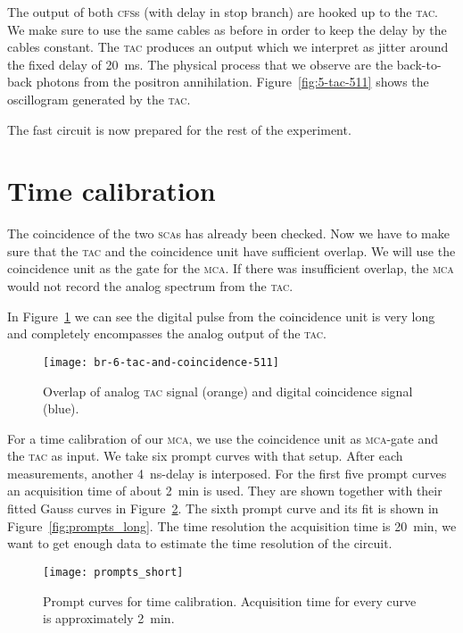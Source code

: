 \documentclass[11pt, english, fleqn, DIV=15, headinclude, BCOR=2cm]{scrreprt}
\begin{document}
The output of both \textsc{cfs}s (with delay in stop branch) are hooked up to
the \textsc{tac}. We make sure to use the same cables as before in order to
keep the delay by the cables constant. The \textsc{tac} produces an output
which we interpret as jitter around the fixed delay of \SI{20}{\milli\second}.
The physical process that we observe are the back-to-back photons from the
positron annihilation. Figure~\ref{fig:5-tac-511} shows the oscillogram
generated by the \textsc{tac}.

The fast circuit is now prepared for the rest of the experiment.

\section{Time calibration}

The coincidence of the two \textsc{sca}s has already been checked. Now we have
to make sure that the \textsc{tac} and the coincidence unit have sufficient
overlap. We will use the coincidence unit as the gate for the \textsc{mca}. If
there was insufficient overlap, the \textsc{mca} would not record the analog
spectrum from the \textsc{tac}.

In Figure~\ref{fig:6-tac-and-coincidence-511} we can see the digital pulse from
the coincidence unit is very long and completely encompasses the analog output
of the \textsc{tac}.

\begin{figure}
    \centering
    \texttt{[image: br-6-tac-and-coincidence-511]}
    \caption{%
        Overlap of analog \textsc{tac} signal (orange) and digital coincidence
        signal (blue).
    }
    \label{fig:6-tac-and-coincidence-511}
\end{figure}

For a time calibration of our \textsc{mca}, we use the coincidence unit as
\textsc{mca}-gate and the \textsc{tac} as input. We take six prompt curves with
that setup. After each measurements, another \SI{4}{\nano\second}-delay is
interposed. For the first five prompt curves an acquisition time of about
\SI{2}{\minute} is used. They are shown together with their fitted Gauss curves
in Figure~\ref{fig:prompts_short}. The sixth prompt curve and its fit is shown
in Figure~\ref{fig:prompts_long}. The time resolution the acquisition time is
\SI{20}{\minute}, we want to get enough data to estimate the time resolution of
the circuit.

\begin{figure}
    \centering
    \texttt{[image: prompts\_short]}
    \caption{%
        Prompt curves for time calibration. Acquisition time for every
        curve is approximately \SI{2}{\minute}.
    }
    \label{fig:prompts_short}
\end{figure}
\end{document}
